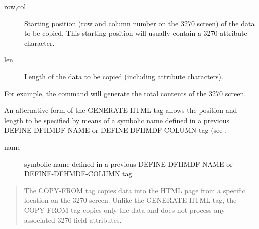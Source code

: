 \documentclass[letterpaper,10pt,english]{sphinxmanual}
\begin{document}
\begin{sphinxVerbatim}[commandchars=\\\{\}]
     
\end{sphinxVerbatim}
\begin{description}
\item[{row,col}] \leavevmode
Starting position (row and column number on the 3270 screen) of the
data to be copied. This starting position will usually contain a
3270 attribute character.

\item[{len}] \leavevmode
Length of the data to be copied (including attribute characters).

\end{description}

For example, the command  will  generate the total contents of the 3270 screen.

An alternative form of the GENERATE-HTML tag allows the position and length to be specified by means of a symbolic name defined in a previous DEFINE-DFHMDF-NAME or DEFINE-DFHMDF-COLUMN tag (see {\hyperref[\detokenize{User_Guide:v457ug-define-dfhmdf-column}]{}}.

\begin{sphinxVerbatim}[commandchars=\\\{\}]
   
\end{sphinxVerbatim}
\begin{description}
\item[{name}] \leavevmode
symbolic name defined in a previous DEFINE-DFHMDF-NAME or
DEFINE-DFHMDF-COLUMN tag.

\end{description}

\begin{quote}

The COPY-FROM tag copies data into the HTML page from a specific
location on the 3270 screen. Unlike the GENERATE-HTML tag, the
COPY-FROM tag copies only the data and does not process any
associated 3270 field attributes.
\end{quote}
\end{document}
